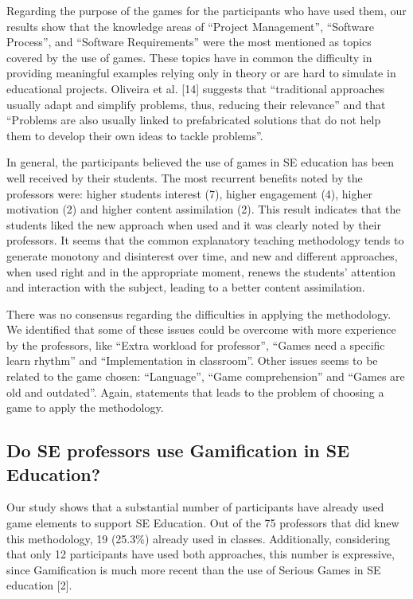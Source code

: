 Regarding the purpose of the games for the participants who have used them, our results show that the knowledge areas of “Project Management”, “Software Process”, and “Software Requirements” were the most mentioned as topics covered by the use of games.  These topics have in common the difficulty in providing meaningful examples relying only in theory or are hard to simulate in educational projects. Oliveira et al. [14] suggests that “traditional approaches usually adapt and simplify problems, thus, reducing their relevance” and that “Problems are also usually linked to prefabricated solutions that do not help them to develop their own ideas to tackle problems”.

In general, the participants believed the use of games in SE education has been well received by their students. The most recurrent benefits noted by the professors were: higher students interest (7), higher engagement (4), higher motivation (2) and higher content assimilation (2). This result indicates that the students liked the new approach when used and it was clearly noted by their professors. It seems that the common explanatory teaching methodology tends to generate monotony and disinterest over time, and new and different approaches, when used right and in the appropriate moment, renews the students’ attention and interaction with the subject, leading to a better content assimilation.

There was no consensus regarding the difficulties in applying the methodology. We identified that some of these issues could be overcome with more experience by the professors, like “Extra workload for professor”, “Games need a specific learn rhythm” and “Implementation in classroom”. Other issues seems to be related to the game chosen: “Language”, “Game comprehension” and “Games are old and outdated”. Again, statements that leads to the problem of choosing a game to apply the methodology.


\subsection{Do SE professors use Gamification in SE Education?}

Our study shows that a substantial number of participants have already used game elements to support SE Education. Out of the 75 professors that did knew this methodology, 19 (25.3\%) already used in classes.  Additionally, considering that only 12 participants have used both approaches, this number is expressive, since Gamification is much more recent than the use of Serious Games in SE education [2].

